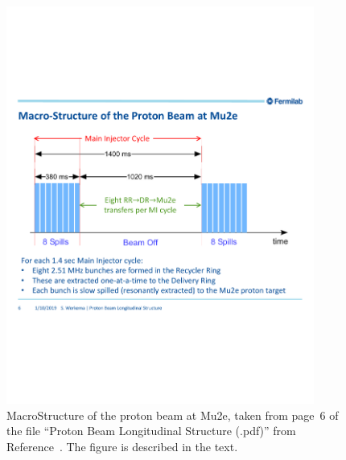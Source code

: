 \begin{figure}[tbp]
\centering
\includegraphics[width=0.9\textwidth]{figures/ProtonBeamLongitudinalStructure2019-01-10_page6.pdf}
\caption[MacroStructure of the Proton Beam at Mu2e]{
  MacroStructure of the proton beam at Mu2e, taken from page~6 of
  the file ``Proton Beam Longitudinal Structure (.pdf)'' from
  Reference~.  The figure is described in the text.}
\label{fig:beamMacroStructure}
\end{figure}

